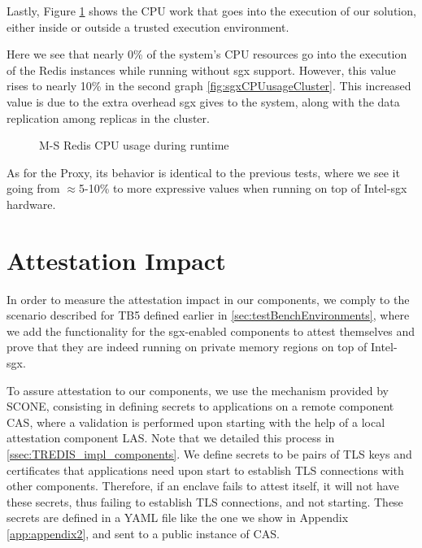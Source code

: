 Lastly, Figure \ref{fig:cpuUsageCluster} shows the CPU work that goes into the execution of our solution, either inside or outside a trusted execution environment. 

Here we see that nearly 0\% of the system's CPU resources go into the execution of the Redis instances while running without \gls{sgx} support. However, this value rises to nearly 10\% in the second graph \ref{fig:sgxCPUusageCluster}. This increased value is due to the extra overhead \gls{sgx} gives to the system, along with the data replication among replicas in the cluster.

\begin{figure}[htbp]
	\centering
	\caption{M-S Redis CPU usage during runtime}
	\label{fig:cpuUsageCluster}
\end{figure}

As for the Proxy, its behavior is identical to the previous tests, where we see it going from $\approx$5-10\% to more expressive values when running on top of Intel-\gls{sgx} hardware.

\section{Attestation Impact}

In order to measure the attestation impact in our components, we comply to the scenario described for TB5 defined earlier in \ref{sec:testBenchEnvironments}, where we add the functionality for the \gls{sgx}-enabled components to attest themselves and prove that they are indeed running on private memory regions on top of Intel-\gls{sgx}. 

To assure attestation to our components, we use the mechanism provided by SCONE, consisting in defining secrets to applications on a remote component CAS, where a validation is performed upon starting with the help of a local attestation component LAS. Note that we detailed this process in \ref{ssec:TREDIS_impl_components}. 
We define secrets to be pairs of TLS keys and certificates that applications need upon start to establish TLS connections with other components. Therefore, if an enclave fails to attest itself, it will not have these secrets, thus failing to establish TLS connections, and not starting. These secrets are defined in a YAML file like the one we show in Appendix \ref{app:appendix2}, and sent to a public instance of CAS. 

